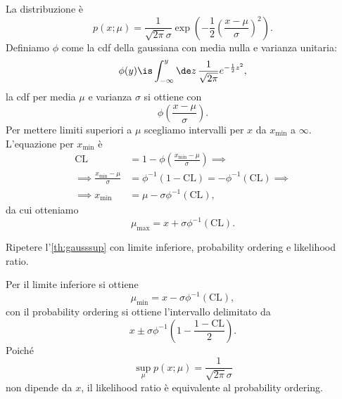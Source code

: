 \begin{solution*}
	La distribuzione è
	\begin{equation*}
		p(x;\mu)
		= \frac1{\sqrt{2\pi}\sigma} \exp \left( -\frac12\left(\frac{x-\mu}\sigma\right)^2 \right).
	\end{equation*}
	Definiamo $\phi$ come la cdf della gaussiana con media nulla e varianza unitaria:
	\begin{equation*}
		\phi(y)
		\is \int_{-\infty}^y \de z\, \frac1{\sqrt{2\pi}} e^{-\frac12 z^2},
	\end{equation*}
	la cdf per media $\mu$ e varianza $\sigma$ si ottiene con
	\begin{equation*}
		\phi\left(\frac{x-\mu}\sigma\right).
	\end{equation*}
	Per mettere limiti superiori a $\mu$ scegliamo intervalli per $x$ da $x_\mathrm{min}$ a $\infty$.
	L'equazione per $x_\mathrm{min}$ è
	\begin{align*}
		\mathrm{CL}
		&= 1 - \phi\left(\frac{x_\mathrm{min}-\mu}\sigma\right) \implies \\
		\implies \frac{x_\mathrm{min}-\mu}\sigma
		&= \phi^{-1}(1-\mathrm{CL}) = -\phi^{-1}(\mathrm{CL}) \implies \\
		\implies x_\mathrm{min}
		&= \mu - \sigma\phi^{-1}(\mathrm{CL}),
	\end{align*}
	da cui otteniamo
	\begin{equation*}
		\mu_\mathrm{max} = x + \sigma\phi^{-1}(\mathrm{CL}).
	\end{equation*}
\end{solution*}

\begin{exercise}
	Ripetere l'\autoref{th:gausssup} con limite inferiore, probability ordering e likelihood ratio.
\end{exercise}

\begin{solution}
	Per il limite inferiore si ottiene
	\begin{equation*}
		\mu_\mathrm{min}
		= x - \sigma\phi^{-1}(\mathrm{CL}),
	\end{equation*}
	con il probability ordering si ottiene l'intervallo delimitato da
	\begin{equation*}
		x \pm \sigma\phi^{-1} \left( 1- \frac{1-\mathrm{CL}}2 \right).
	\end{equation*}
	Poiché
	\begin{equation*}
		\sup\limits_\mu p(x;\mu)
		= \frac1{\sqrt{2\pi}\sigma}
	\end{equation*}
	non dipende da $x$,
	il likelihood ratio è equivalente al probability ordering.
\end{solution}

